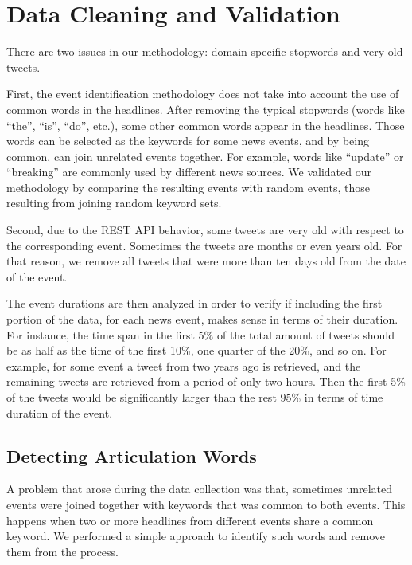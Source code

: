\section{Data Cleaning and Validation}\label{sec:cleaning}

There are two issues in our methodology: domain-specific stopwords and very old
tweets.

First, the event identification methodology does not take into account the use
of common words in the headlines. 
%
After removing the typical stopwords (words like ``the'', ``is'', ``do'', etc.),
some other common words appear in the headlines. 
%
Those words can be selected as the keywords for some news events, and by being
common, can join unrelated events together.
%
For example, words like ``update'' or ``breaking'' are commonly used by
different news sources. 
%
We validated our methodology by comparing the resulting events with random
events, those resulting from joining random keyword sets.

Second, due to the REST API behavior, some tweets are very old with respect to
the corresponding event. 
%
Sometimes the tweets are months or even years old. 
%
For that reason, we remove all tweets that were more than ten days old from the
date of the event. 

The event durations are then analyzed in order to verify if including the first
portion of the data, for each news event, makes sense in terms of their
duration. 
%
For instance, the time span in the first 5\% of the total amount of tweets
should be as half as the time of the first 10\%, one quarter of the 20\%, and so
on. 
%
For example, for some event a tweet from two years ago is retrieved, and the
remaining tweets are retrieved from a period of only two hours. 
%
Then the first 5\% of the tweets would be significantly larger than the rest
95\% in terms of time duration of the event. 


\subsection{Detecting Articulation Words}

A problem that arose during the data collection was that, sometimes unrelated
events were joined together with keywords that was common to both events.  
%
This happens when two or more headlines from different events share a common
keyword. 
%
We performed a simple approach to identify such words and remove them from the
process.


